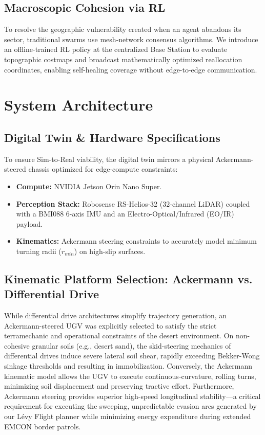 \documentclass[conference]{IEEEtran}
\begin{document}
\subsection{Macroscopic Cohesion via RL}
To resolve the geographic vulnerability created when an agent abandons its sector, traditional swarms use mesh-network consensus algorithms. We introduce an offline-trained RL policy at the centralized Base Station to evaluate topographic costmaps and broadcast mathematically optimized reallocation coordinates, enabling self-healing coverage without edge-to-edge communication.

\section{System Architecture}

\subsection{Digital Twin \& Hardware Specifications}
To ensure Sim-to-Real viability, the digital twin mirrors a physical Ackermann-steered chassis optimized for edge-compute constraints:
\begin{itemize}
    \item \textbf{Compute:} NVIDIA Jetson Orin Nano Super.
    \item \textbf{Perception Stack:} Robosense RS-Helios-32 (32-channel LiDAR) coupled with a BMI088 6-axis IMU and an Electro-Optical/Infrared (EO/IR) payload.
    \item \textbf{Kinematics:} Ackermann steering constraints to accurately model minimum turning radii ($r_{min}$) on high-slip surfaces.
\end{itemize}

\subsection{Kinematic Platform Selection: Ackermann vs. Differential Drive}
While differential drive architectures simplify trajectory generation, an Ackermann-steered UGV was explicitly selected to satisfy the strict terramechanic and operational constraints of the desert environment. On non-cohesive granular soils (e.g., desert sand), the skid-steering mechanics of differential drives induce severe lateral soil shear, rapidly exceeding Bekker-Wong sinkage thresholds and resulting in immobilization. Conversely, the Ackermann kinematic model allows the UGV to execute continuous-curvature, rolling turns, minimizing soil displacement and preserving tractive effort. Furthermore, Ackermann steering provides superior high-speed longitudinal stability—a critical requirement for executing the sweeping, unpredictable evasion arcs generated by our Lévy Flight planner while minimizing energy expenditure during extended EMCON border patrols.
\end{document}
